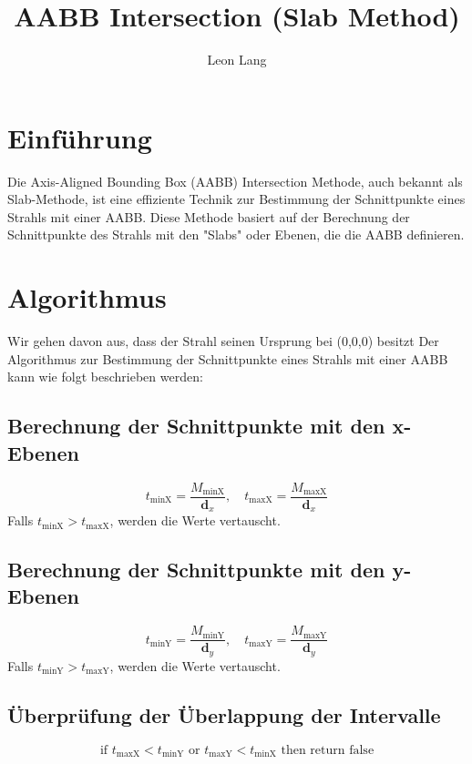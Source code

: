\documentclass{article}
\begin{document}
	
	\title{AABB Intersection (Slab Method)}
	\author{Leon Lang}
	\maketitle
	
	\section{Einführung}
	Die Axis-Aligned Bounding Box (AABB) Intersection Methode, auch bekannt als Slab-Methode, ist eine effiziente Technik zur Bestimmung der Schnittpunkte eines Strahls mit einer AABB. Diese Methode basiert auf der Berechnung der Schnittpunkte des Strahls mit den "Slabs" oder Ebenen, die die AABB definieren.
	
	\section{Algorithmus}
	Wir gehen davon aus, dass der Strahl seinen Ursprung bei (0,0,0) besitzt
	Der Algorithmus zur Bestimmung der Schnittpunkte eines Strahls mit einer AABB kann wie folgt beschrieben werden:
	
	\subsection{Berechnung der Schnittpunkte mit den x-Ebenen}
	\begin{equation}
		t_{\text{minX}} = \frac{M_{\text{minX}}}{\mathbf{d}_x}, \quad t_{\text{maxX}} = \frac{M_{\text{maxX}}}{\mathbf{d}_x}
	\end{equation}
	Falls \( t_{\text{minX}} > t_{\text{maxX}} \), werden die Werte vertauscht.
	
	\subsection{Berechnung der Schnittpunkte mit den y-Ebenen}
	\begin{equation}
		t_{\text{minY}} = \frac{M_{\text{minY}}}{\mathbf{d}_y}, \quad t_{\text{maxY}} = \frac{M_{\text{maxY}}}{\mathbf{d}_y}
	\end{equation}
	Falls \( t_{\text{minY}} > t_{\text{maxY}} \), werden die Werte vertauscht.
	
	\subsection{Überprüfung der Überlappung der Intervalle}
	\begin{equation}
		\text{if } t_{\text{maxX}} < t_{\text{minY}} \text{ or } t_{\text{maxY}} < t_{\text{minX}} \text{ then return false}
	\end{equation}
	
\end{document}
